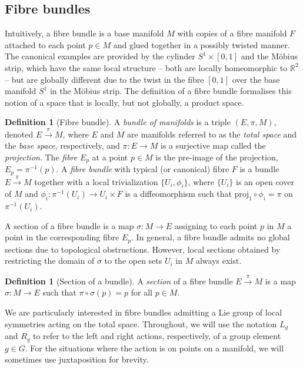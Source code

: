 \documentclass[12pt,a4paper]{article}
\numberwithin{equation}{section}
\theoremstyle{plain}
\theoremstyle{definition}
\newtheorem{definition}[theorem]{Definition}
\theoremstyle{remark}
\begin{document}
\subsection{Fibre bundles}\label{sec:fibre_bundles}
Intuitively, a fibre bundle is a base manifold $M$ with copies of a fibre manifold $F$ attached to each point $p\in M$ and glued together in a possibly twisted manner. The canonical examples are provided by the cylinder $S^1 \times [0,1]$ and the Möbius strip, which have the same local structure -- both are locally homeomorphic to $\mathbb{R}^2$ -- but are globally different due to the twist in the fibre $[0,1]$ over the base manifold $S^1$ in the Möbius strip. The definition of a fibre bundle formalises this notion of a space that is locally, but not globally, a product space.

\begin{definition}[Fibre bundle]\label{dfn:fibre_bundle}
    A \textit{bundle of manifolds} is a triple $(E,\pi,M)$, denoted $E\overset{\pi}{\to}M$, where $E$ and $M$ are manifolds referred to as the \textit{total space} and the \textit{base space}, respectively, and $\pi:E\to M$ is a surjective map called the \textit{projection}. The \textit{fibre} $E_p$ at a point $p\in M$ is the pre-image of the projection, $E_p =\pi^{-1}(p)$. A \textit{fibre bundle} with typical (or canonical) fibre $F$ is a bundle $E\overset{\pi}{\to}M$ together with a local trivialization $\{U_i,\phi_i\}$, where $\{U_i\}$ is an open cover of $M$ and $\phi_i:\pi^{-1}(U_i)\to U_i\times F$ is a diffeomorphism such that $\text{proj}_1\circ\phi_i=\pi$ on $\pi^{-1}(U_i)$.
\end{definition}

A section of a fibre bundle is a map $\sigma : M \to E$ assigning to each point $p$ in $M$ a point in the corresponding fibre $E_p$. In general, a fibre bundle admits no global sections due to topological obstructions. However, local sections obtained by restricting the domain of $\sigma$ to the open sets $U_i$ in $M$ always exist.

\begin{definition}[Section of a bundle]\label{dfn:section_bundle}
    A \textit{section} of a fibre bundle $E\overset{\pi}{\to}M$ is a map $\sigma:M\to E$ such that $\pi\circ\sigma(p)=p$ for all $p\in M$.
\end{definition}

We are particularly interested in fibre bundles admitting a Lie group of local symmetries acting on the total space. Throughout, we will use the notation $L_g$ and $R_g$ to refer to the left and right actions, respectively, of a group element $g\in G$. For the situations where the action is on points on a manifold, we will sometimes use juxtaposition for brevity.
\end{document}
